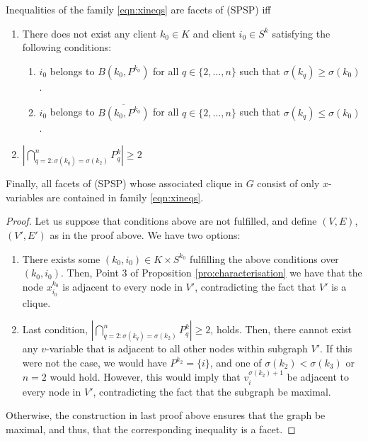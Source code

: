 \begin{theorem}
    \label{thm:xfacets}
    Inequalities of the family \eqref{eqn:xineqs} are facets of \rm{(SPSP)} iff
    \begin{enumerate}
        \item
            There does not exist any client $k_0 \in K$ and client $i_0 \in S^k$
            satisfying the following conditions:
            \begin{enumerate}
        	\item %
        	    $i_0$ belongs to $B(k_0, P^{k_0})$ for all $q \in \{2, \ldots, n\}$
        	    such that $\sigma(k_q) \geq \sigma(k_0)$.
        	\item %
        	    $i_0$ belongs to $\overline{B(k_0, P^{k_0})}$ for all $q \in \{2,
        	    \ldots, n\}$ such that $\sigma(k_q) \leq \sigma(k_0)$.
            \end{enumerate}
       \item
	    \(
                    \left|
                        \bigcap_{q=2:\sigma(k_q) = \sigma(k_2)}^n
                            P^k_q
                    \right|
	        \geq
	            2
	    \)
    \end{enumerate}
    \noindent
    Finally, all facets of \rm{(SPSP)} whose associated clique in $G$ consist of
    only $x$-variables are contained in family \eqref{eqn:xineqs}.
\end{theorem}

\begin{proof}
    Let us suppose that conditions above are not fulfilled, and define $(V, E)$,
    $(V', E')$ as in the proof above. We have two options:
    \begin{enumerate}
        \item
	    There exists some $(k_0, i_0) \in K \times S^{k_0}$ fulfilling the
	    above conditions over $(k_0, i_0)$. Then, Point 3 of Proposition
	    \ref{pro:characterisation} we have that the node $x_{i_0}^{k_0}$ is adjacent
	    to every node in $V'$, contradicting the fact that $V'$ is a clique.
	\item
	    Last condition,
            \(
                    \left|
                        \bigcap_{q=2:\sigma(k_q) = \sigma(k_2)}^n
                            P^k_q
                    \right|
	        \geq
	            2
	    \),
	    holds. Then, there cannot exist any $v$-variable that is adjacent to
	    all other nodes within subgraph $V'$. If this were not the case, we
	    would have $P^{k_2}=\{i\}$, and one of $\sigma(k_2) < \sigma(k_3)$
	    or $n=2$ would hold. However, this would imply that
	    $v_i^{\sigma(k_2)+1}$ be adjacent to every node in $V'$,
	    contradicting the fact that the subgraph be maximal.
    \end{enumerate}
    Otherwise, the construction in last proof above ensures that the graph be
    maximal, and thus, that the corresponding inequality is a facet.
\end{proof}

